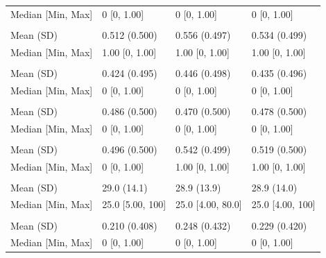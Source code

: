 \documentclass[smallextended]{svjour3}
\newenvironment{knitrout}{}{} %
\begin{document}
\begin{knitrout}
\begin{tabular}[t]{llll}
\hspace{1em}Median [Min, Max] & 0 [0, 1.00] & 0 [0, 1.00] & 0 [0, \vphantom{3} 1.00]\\
\addlinespace[0.3em]
\multicolumn{4}{l}{\textbf{z2}}\\
\hspace{1em}Mean (SD) & 0.512 (0.500) & 0.556 (0.497) & 0.534 (0.499)\\
\hspace{1em}Median [Min, Max] & 1.00 [0, 1.00] & 1.00 [0, 1.00] & 1.00 [0, 1.00]\\
\addlinespace[0.3em]
\multicolumn{4}{l}{\textbf{z3}}\\
\hspace{1em}Mean (SD) & 0.424 (0.495) & 0.446 (0.498) & 0.435 (0.496)\\
\hspace{1em}Median [Min, Max] & 0 [0, 1.00] & 0 [0, 1.00] & 0 [0, \vphantom{2} 1.00]\\
\addlinespace[0.3em]
\multicolumn{4}{l}{\textbf{z4}}\\
\hspace{1em}Mean (SD) & 0.486 (0.500) & 0.470 (0.500) & 0.478 (0.500)\\
\hspace{1em}Median [Min, Max] & 0 [0, 1.00] & 0 [0, 1.00] & 0 [0, \vphantom{1} 1.00]\\
\addlinespace[0.3em]
\multicolumn{4}{l}{\textbf{z5}}\\
\hspace{1em}Mean (SD) & 0.496 (0.500) & 0.542 (0.499) & 0.519 (0.500)\\
\hspace{1em}Median [Min, Max] & 0 [0, 1.00] & 1.00 [0, 1.00] & 1.00 [0, 1.00]\\
\addlinespace[0.3em]
\multicolumn{4}{l}{\textbf{size}}\\
\hspace{1em}Mean (SD) & 29.0 (14.1) & 28.9 (13.9) & 28.9 (14.0)\\
\hspace{1em}Median [Min, Max] & 25.0 [5.00, 100] & 25.0 [4.00, 80.0] & 25.0 [4.00, 100]\\
\addlinespace[0.3em]
\multicolumn{4}{l}{\textbf{grade3}}\\
\hspace{1em}Mean (SD) & 0.210 (0.408) & 0.248 (0.432) & 0.229 (0.420)\\
\hspace{1em}Median [Min, Max] & 0 [0, 1.00] & 0 [0, 1.00] & 0 [0, 1.00]\\

\end{tabular}
\end{knitrout}
\end{document}
